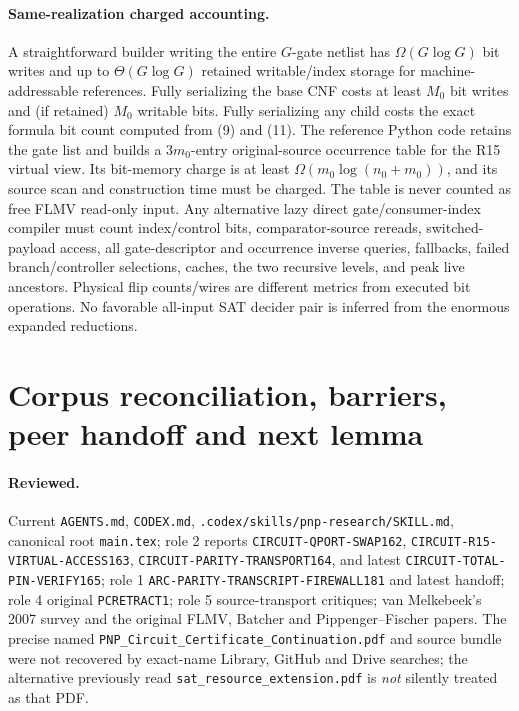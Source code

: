 \documentclass[11pt]{article}
\begin{document}
\paragraph{Same-realization charged accounting.}
A straightforward builder writing the entire $G$-gate netlist has
$\Omega(G\log G)$ bit writes and up to $\Theta(G\log G)$ retained
writable/index storage for machine-addressable references. Fully
serializing the base CNF costs at least $M_0$ bit writes and (if retained)
$M_0$ writable bits. Fully serializing any child costs the exact formula
bit count computed from (9) and (11). The reference Python code retains
the gate list and builds a $3m_0$-entry original-source occurrence table
for the R15 virtual view. Its bit-memory charge is at least
$\Omega(m_0\log(n_0+m_0))$, and its source scan and construction time
must be charged. The table is never counted as free FLMV read-only input.
Any alternative lazy direct gate/consumer-index compiler must count
index/control bits, comparator-source rereads, switched-payload access,
all gate-descriptor and occurrence inverse queries, fallbacks, failed
branch/controller selections, caches, the two recursive levels, and
peak live ancestors. Physical flip counts/wires are different metrics
from executed bit operations. No favorable all-input SAT decider pair is
inferred from the enormous expanded reductions.

\section{Corpus reconciliation, barriers, peer handoff and next lemma}
\paragraph{Reviewed.} Current \texttt{AGENTS.md}, \texttt{CODEX.md},
\texttt{.codex/skills/pnp-research/SKILL.md}, canonical root
\texttt{main.tex}; role 2 reports
\texttt{CIRCUIT-QPORT-SWAP162}, \texttt{CIRCUIT-R15-VIRTUAL-ACCESS163},
\texttt{CIRCUIT-PARITY-TRANSPORT164}, and latest
\texttt{CIRCUIT-TOTAL-PIN-VERIFY165}; role 1
\texttt{ARC-PARITY-TRANSCRIPT-FIREWALL181} and latest handoff;
role 4 original \texttt{PCRETRACT1}; role 5 source-transport critiques;
van Melkebeek's 2007 survey and the original FLMV, Batcher and
Pippenger--Fischer papers. The precise named
\texttt{PNP\_Circuit\_Certificate\_Continuation.pdf} and source bundle
were not recovered by exact-name Library, GitHub and Drive searches; the
alternative previously read \texttt{sat\_resource\_extension.pdf} is
\emph{not} silently treated as that PDF.
\end{document}
